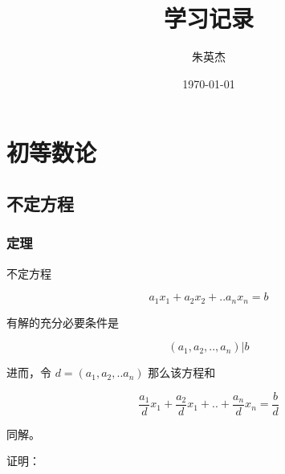\documentclass[12pt,a4paper]{ctexart}
\title{学习记录}
\author{朱英杰}
\date{\today}
\begin{document}
\maketitle
\tableofcontents

\section{初等数论}

\subsection{不定方程}

\subsubsection{定理}

不定方程 

\[
a_1x_1 + a_2x_2 + .. a_nx_n = b
\]

有解的充分必要条件是

\[
(a_1,a_2,..,a_n) \vert b
\]

进而，令 $d = (a_1,a_2,..a_n)$ 那么该方程和

\[
\frac{a_1}{d}x_1 + \frac{a_2}{d}x_1 + .. + \frac{a_n}{d}x_n = \frac{b}{d}
\]

同解。

证明：
\end{document}
